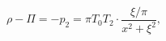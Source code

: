 \begin{equation}\label{ed0}
\rho-\Pi = -p_{2} = \pi T_0 T_2 \cdot
\frac{\xi/\pi}{x^2 + \xi^2},
\end{equation}

